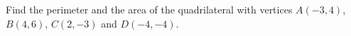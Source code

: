 Find the perimeter and the area of the quadrilateral with vertices $A(-3,4)$, $B(4,6)$, $C(2,-3)$ and $D(-4,-4)$.
